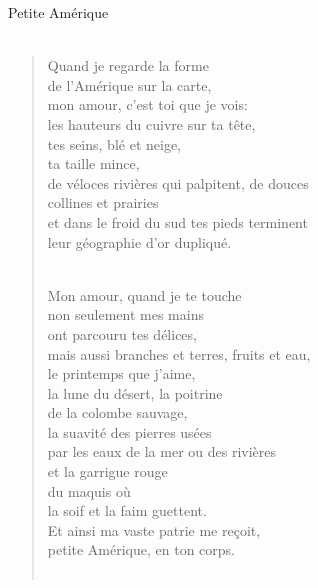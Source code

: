 \documentclass[11pt,a4paper]{book}
\begin{document}
\newpage

{\huge Petite Amérique} \\ \\

\begin{verse}
Quand je regarde la forme \\
de l'Amérique sur la carte, \\
mon amour, c'est toi que je vois: \\
les hauteurs du cuivre sur ta tête, \\
tes seins, blé et neige, \\
ta taille mince, \\
de véloces rivières qui palpitent, de douces \\
collines et prairies \\
et dans le froid du sud tes pieds terminent \\
leur géographie d'or dupliqué. \\ \

Mon amour, quand je te touche \\
non seulement mes mains \\
ont parcouru tes délices, \\
mais aussi branches et terres, fruits et eau, \\
le printemps que j'aime, \\
la lune du désert, la poitrine \\
de la colombe sauvage, \\
la suavité des pierres usées \\
par les eaux de la mer ou des rivières \\
et la garrigue rouge \\
du maquis où \\
la soif et la faim guettent. \\
Et ainsi ma vaste patrie me re\c{c}oit, \\
petite Amérique, en ton corps. \\ \


\end{verse}
\end{document}
